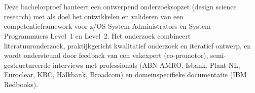 
\chapter{}%
\label{ch:methodologie}


Deze bachelorproef hanteert een ontwerpend onderzoeksopzet (design science research) met als doel het ontwikkelen en valideren van een competentieframework voor z/OS System Administrators en System Programmuers Level~1 en Level~2. Het onderzoek combineert literatuuronderzoek, praktijkgericht kwalitatief onderzoek en iteratief ontwerp, en wordt ondersteund door feedback van een vakexpert (co-promotor), semi-gestructureerde interviews met professionals (ABN AMRO, Isbank, Plant NL, Euroclear, KBC, Halkbank, Broadcom) en domeinspecifieke documentatie (IBM Redbooks). 

